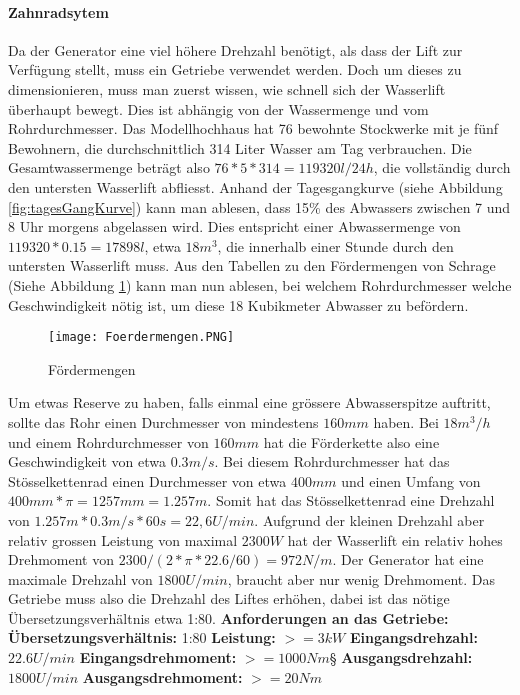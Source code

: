 \paragraph{Zahnradsytem}
Da der Generator eine viel höhere Drehzahl benötigt, als dass der Lift zur Verfügung stellt, muss ein Getriebe verwendet werden. Doch um dieses zu dimensionieren, muss man zuerst wissen, wie schnell sich der Wasserlift überhaupt bewegt. Dies ist abhängig von der Wassermenge und vom Rohrdurchmesser. Das Modellhochhaus hat 76 bewohnte Stockwerke mit je fünf Bewohnern, die durchschnittlich 314 Liter Wasser am Tag verbrauchen. Die Gesamtwassermenge beträgt also \(76 * 5 * 314 = 119320 l/24h\), die vollständig durch den untersten Wasserlift abfliesst. Anhand der Tagesgangkurve (siehe Abbildung \ref{fig:tagesGangKurve}) kann man ablesen, dass 15\% des Abwassers zwischen 7 und 8 Uhr morgens abgelassen wird. Dies entspricht einer Abwassermenge von \(119320 * 0.15 = 17898 l\), etwa \(18 m^3 \), die innerhalb einer Stunde durch den untersten Wasserlift muss. Aus den Tabellen zu den Fördermengen von Schrage (Siehe Abbildung \ref{fig:foerdermengen}) kann man nun ablesen, bei welchem Rohrdurchmesser welche Geschwindigkeit nötig ist, um diese 18 Kubikmeter Abwasser zu befördern. 

\begin{figure} [H]
	\centering
	\texttt{[image: Foerdermengen.PNG]}
	\caption{Fördermengen \cite{schrage}}
	\label{fig:foerdermengen}
\end{figure}

Um etwas Reserve zu haben, falls einmal eine grössere Abwasserspitze auftritt, sollte das Rohr einen Durchmesser von mindestens \(160mm\) haben. Bei \(18 m^3 /h \) und einem Rohrdurchmesser von \(160mm\) hat die Förderkette also eine Geschwindigkeit von etwa \(0.3 m/s \). Bei diesem Rohrdurchmesser hat das Stösselkettenrad einen Durchmesser von etwa \(400mm\)\cite{schrage} und einen Umfang von \(400mm * \pi = 1257mm = 1.257m\). Somit hat das Stösselkettenrad eine Drehzahl von \(1.257m * 0.3 m/s * 60s = 22,6 U/min\). Aufgrund der kleinen Drehzahl aber relativ grossen Leistung von maximal \(2300 W\) hat der Wasserlift ein relativ hohes Drehmoment von \( 2300 /(2 * \pi * 22.6/ 60) = 972 N/m\). Der Generator hat eine maximale Drehzahl von \(1800 U/min\), braucht aber nur wenig Drehmoment. Das Getriebe muss also die Drehzahl des Liftes erhöhen, dabei ist das nötige Übersetzungsverhältnis etwa 1:80. 
\textbf{Anforderungen an das Getriebe:}				\newline
\textbf{Übersetzungsverhältnis:}	1:80			\newline
\textbf{Leistung:}					\(>=3 kW\)		\newline
\textbf{Eingangsdrehzahl:}			\(22.6 U/min\)	\newline
\textbf{Eingangsdrehmoment:}		\(>=1000 Nm\)§	\newline
\textbf{Ausgangsdrehzahl:}			\(1800 U/min\)	\newline
\textbf{Ausgangsdrehmoment:}		\(>= 20 Nm\)	\newline

